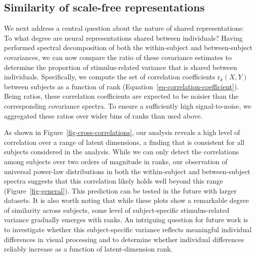 \documentclass[10pt]{article}
\begin{document}
\subsection{Similarity of scale-free
representations}\label{sec-similarity-of-scale-free-representations}

We next address a central question about the nature of shared
representations: To what degree are neural representations shared
between individuals? Having performed spectral decomposition of both the
within-subject and between-subject covariances, we can now compare the
ratio of these covariance estimates to determine the proportion of
stimulus-related variance that is shared between individuals.
Specifically, we compute the set of correlation coefficients
\(\mathrm{r}_k(X,Y)\) between subjects as a function of rank
(Equation~\ref{eq-correlation-coefficient}). Being ratios, these
correlation coefficients are expected to be noisier than the
corresponding covariance spectra. To ensure a sufficiently high
signal-to-noise, we aggregated these ratios over wider bins of ranks
than used above.

As shown in Figure~\ref{fig-cross-correlations}, our analysis reveals a
high level of correlation over a range of latent dimensions, a finding
that is consistent for all subjects considered in the analysis. While we
can only detect the correlations among subjects over two orders of
magnitude in ranks, our observation of universal power-law distributions
in both the within-subject and between-subject spectra suggests that
this correlation likely holds well beyond this range
(Figure~\ref{fig-general}). This prediction can be tested in the future
with larger datasets. It is also worth noting that while these plots
show a remarkable degree of similarity across subjects, some level of
subject-specific stimulus-related variance gradually emerges with ranks.
An intriguing question for future work is to investigate whether this
subject-specific variance reflects meaningful individual differences in
visual processing and to determine whether individual differences
reliably increase as a function of latent-dimension rank.
\end{document}
